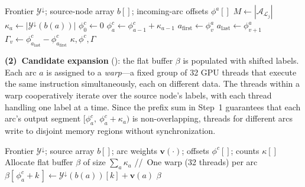 \documentclass[letterpaper]{article}
\begin{document}
\begin{algorithm}[tbp]
\caption{GPU Subroutine: Compute Arc Offsets}
\label{alg:compute_arc_offsets}
\begin{algorithmic}[1]
\Require Frontier $\mathcal{Y}^{\downarrow}$; source-node array $b[]$; incoming-arc offsets $\phi^a[]$
\State $M \gets |\mathcal{A}_{\mathcal{L}_j}|$ 
 
    \State $\kappa_a \gets |\mathcal{Y}^{\downarrow}(b(a))|$
\EndFor
\State $\phi^c_0 \gets 0$
    \State $\phi^c_a \gets \phi^c_{a-1} + \kappa_{a-1}$
\EndFor
{}
    \State $a_{\text{first}} \gets \phi^a_v$
    \State $a_{\text{last}} \gets \phi^a_{v{+}1}$
    \State $\Gamma_v \gets \phi^c_{a_{\text{last}}} - \phi^c_{a_{\text{first}}}$
\EndFor
\State \Return $\kappa, \phi^c, \Gamma$
\EndProcedure
\end{algorithmic}
\end{algorithm}

\textbf{(2)~Candidate expansion} (): the flat buffer $\beta$ is populated with shifted labels. Each arc $a$ is assigned to a \emph{warp}---a fixed group of 32 GPU threads that execute the same instruction simultaneously, each on different data. The threads within a warp cooperatively iterate over the source node's labels, with each thread handling one label at a time. Since the prefix sum in Step~1 guarantees that each arc's output segment $[\phi^c_a,\ \phi^c_a + \kappa_a)$ is non-overlapping, threads for different arcs write to disjoint memory regions without synchronization.

\begin{algorithm}[tbp]
\caption{GPU Subroutine: Expand Candidates into Flat Buffer}
\label{alg:expand_candidates}
\begin{algorithmic}[1]
\Require Frontier $\mathcal{Y}^{\downarrow}$; source array $b[]$; arc weights $\mathbf{v}(\cdot)$; offsets $\phi^c[]$; counts $\kappa[]$
\State Allocate flat buffer $\beta$ of size $\sum_a \kappa_a$
    \State //~One warp (32 threads) per arc
        \State $\beta[\,\phi^c_a + k\,] \gets \mathcal{Y}^{\downarrow}(b(a))[k] + \mathbf{v}(a)$
    \EndFor
\EndFor
\State \Return $\beta$
\EndProcedure
\end{algorithmic}
\end{algorithm}
\end{document}
